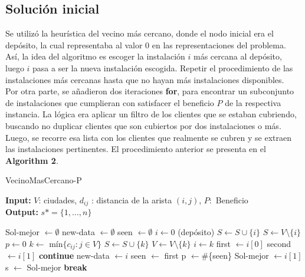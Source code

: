 \documentclass[11pt]{article}
\begin{document}
\subsection{Solución inicial}
Se utilizó la heurística del vecino más cercano, donde el nodo inicial era el depósito, la cual representaba al valor $0$ en las representaciones del problema. Así, la idea del algoritmo es escoger la instalación $i$ más cercana al depósito, luego $i$ pasa a ser la nueva instalación escogida. Repetir el procedimiento de las instalaciones más cercanas hasta que no hayan más instalaciones disponibles.\\
Por otra parte, se añadieron dos iteraciones \textbf{for}, para encontrar un subconjunto de instalaciones que cumplieran con satisfacer el beneficio $P$ de la respectiva instancia. La lógica era aplicar un filtro de los clientes que se estaban cubriendo, buscando no duplicar clientes que son cubiertos por dos instalaciones o más. Luego, se recorre esa lista con los clientes que realmente se cubren y se extraen las instalaciones pertinentes. El procedimiento anterior se presenta en el \textbf{Algorithm 2}.

\begin{algorithm}[H]
    \caption{VecinoMasCercano-P}
    \label{NN}
    \hspace*{} \textbf{Input:} $V$: ciudades, $d_{ij}$ : distancia de la arista $(i,j)$, $P:$ Beneficio \\
    \hspace*{} \textbf{Output:} $s*=\{1, . . . , n\}$
    \begin{algorithmic}[1]
    \State Sol-mejor $  \gets \emptyset$
    \State new-data $  \gets \emptyset$
    \State seen $  \gets \emptyset$
    \State $i \gets 0$ (depósito)
    \State $S \gets S\cup \{i\}$
    \State $S \gets V\setminus\{i\}$
    \State $p \gets 0$ 
        \State $k \gets $ mín$\{c_{ij}: j \in V\}$
        \State $S \gets S\cup \{k\}$
        \State $V \gets  V\setminus\{k\}$
        \State $i \gets k$
            \State first $ \gets i[0]$ 
            \State second $ \gets i[1]$
                    \State \textbf{continue}
                \State new-data $  \gets i$
                \State seen $  \gets $ first
                \State p $ \gets \#$\{seen\}
                \EndIf
            \EndIf
        \EndFor
            \State Sol-mejor $  \gets i[1]$
            \State s $ \gets $ Sol-mejor
        \EndFor
            \State \textbf{break}
            
    \EndWhile
    \end{algorithmic}
\end{algorithm}
\end{document}
